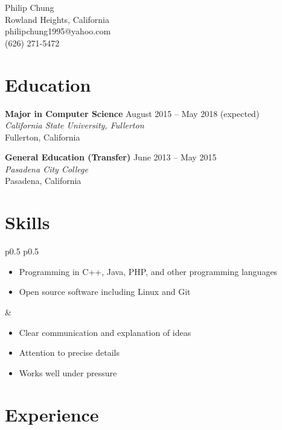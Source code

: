 \documentclass[10pt]{article}
\newcommand{\locheader}[4]{\textbf{#1} \hfill #2 \\ \textit{#3} \\ #4}
\begin{document}
	\begin{center}
		{\LARGE Philip Chung} \\
		Rowland Heights, California \\
		philipchung1995@yahoo.com \\
		(626) 271-5472 \\
	\end{center}

	\section*{Education}

	\locheader{Major in Computer Science}{August 2015 -- May 2018 (expected)}{California State University, Fullerton}{Fullerton, California}

	\locheader{General Education (Transfer)}{June 2013 -- May 2015}{Pasadena City College}{Pasadena, California}

	\section*{Skills}

	\begin{tabular}{p{0.5\textwidth} p{0.5\textwidth}}
		\begin{minipage}{\linewidth}
			\raggedright
			\begin{itemize}[nosep]
				\item Programming in C++, Java, PHP, and other programming languages
				\item Open source software including Linux and Git
			\end{itemize}
		\end{minipage}
		&
		\begin{minipage}{\linewidth}
			\raggedright
			\begin{itemize}[nosep]
				\item Clear communication and explanation of ideas
				\item Attention to precise details
				\item Works well under pressure
			\end{itemize}
		\end{minipage}
	\end{tabular}

	\section*{Experience}
\end{document}
